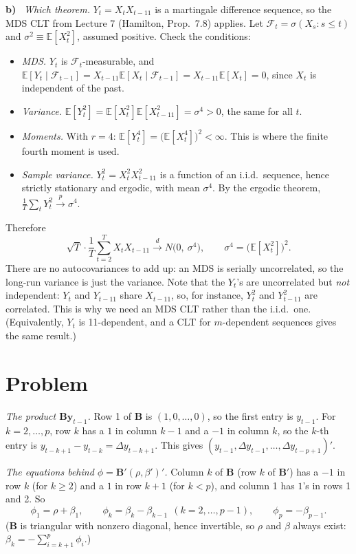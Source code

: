 \documentclass[11pt]{article}
\newcommand{\E}{\mathbb{E}}
\newcommand{\symbf}[1]{\boldsymbol{#1}}
\newcounter{problem}
\renewcommand{\theproblem}{\arabic{problem}}
\newcommand{\problem}{
	\stepcounter{problem}
	\section*{Problem \theproblem}
}
\newcommand{\itm}[1]{\par\textbf{#1)}\ }
\begin{document}
\itm{b}
\emph{Which theorem.} $Y_t=X_tX_{t-11}$ is a martingale difference sequence, so the MDS CLT from Lecture 7 (Hamilton, Prop.\ 7.8) applies. Let $\mathcal F_t=\sigma(X_s:s\le t)$ and $\sigma^2\equiv\E[X_t^2]$, assumed positive. Check the conditions:
\begin{itemize}
	\item \emph{MDS.} $Y_t$ is $\mathcal F_t$-measurable, and $\E[Y_t\mid\mathcal F_{t-1}]=X_{t-11}\E[X_t\mid\mathcal F_{t-1}]=X_{t-11}\E[X_t]=0$, since $X_t$ is independent of the past.
	\item \emph{Variance.} $\E[Y_t^2]=\E[X_t^2]\E[X_{t-11}^2]=\sigma^4>0$, the same for all $t$.
	\item \emph{Moments.} With $r=4$: $\E[Y_t^4]=\big(\E[X_t^4]\big)^2<\infty$. This is where the finite fourth moment is used.
	\item \emph{Sample variance.} $Y_t^2=X_t^2X_{t-11}^2$ is a function of an i.i.d.\ sequence, hence strictly stationary and ergodic, with mean $\sigma^4$. By the ergodic theorem, $\frac1T\sum_tY_t^2\xrightarrow{p}\sigma^4$.
\end{itemize}
Therefore
\[
\sqrt T\cdot\frac1T\sum_{t=2}^TX_tX_{t-11}\xrightarrow{d}N\big(0,\ \sigma^4\big),\qquad\sigma^4=\big(\E[X_t^2]\big)^2 .
\]
There are no autocovariances to add up: an MDS is serially uncorrelated, so the long-run variance is just the variance. Note that the $Y_t$'s are uncorrelated but \emph{not} independent: $Y_t$ and $Y_{t-11}$ share $X_{t-11}$, so, for instance, $Y_t^2$ and $Y_{t-11}^2$ are correlated. This is why we need an MDS CLT rather than the i.i.d.\ one. (Equivalently, $Y_t$ is 11-dependent, and a CLT for $m$-dependent sequences gives the same result.)

\problem

\emph{The product $\symbf B\symbf y_{t-1}$.} Row 1 of $\symbf B$ is $(1,0,\dots,0)$, so the first entry is $y_{t-1}$. For $k=2,\dots,p$, row $k$ has a $1$ in column $k-1$ and a $-1$ in column $k$, so the $k$-th entry is $y_{t-k+1}-y_{t-k}=\Delta y_{t-k+1}$. This gives $(y_{t-1},\Delta y_{t-1},\dots,\Delta y_{t-p+1})'$.

\emph{The equations behind $\phi=\symbf B'(\rho,\beta')'$.} Column $k$ of $\symbf B$ (row $k$ of $\symbf B'$) has a $-1$ in row $k$ (for $k\ge2$) and a $1$ in row $k+1$ (for $k<p$), and column 1 has $1$'s in rows 1 and 2. So
\[
\phi_1=\rho+\beta_1,\qquad\phi_k=\beta_k-\beta_{k-1}\ \ (k=2,\dots,p-1),\qquad\phi_p=-\beta_{p-1}.
\]
($\symbf B$ is triangular with nonzero diagonal, hence invertible, so $\rho$ and $\beta$ always exist: $\beta_k=-\sum_{i=k+1}^p\phi_i$.)
\end{document}
